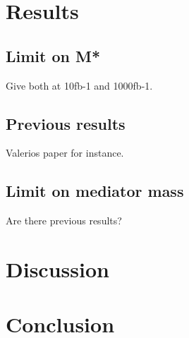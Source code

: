 \section{Results}
\subsection{Limit on M*}
Give both at 10fb-1 and 1000fb-1.
\subsection{Previous results}
Valerios paper for instance.
\subsection{Limit on mediator mass}
Are there previous results?
\section{Discussion}
\section{Conclusion}